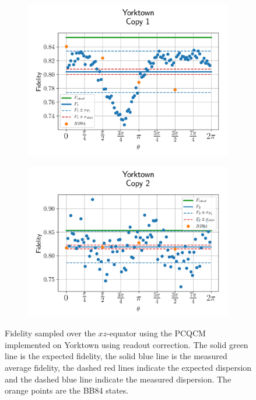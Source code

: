 \begin{figure}[H]
  \centering
  \begin{subfigure}{.5\textwidth}
    \centering
    \includegraphics[width=\textwidth]{Figures/PhaseCovariant/IBM/OnlyEquator/results_corrected_ibmqx2_copy1.png}
    \label{fig:pc_corrected_yorktown_equator_1}
  \end{subfigure}%
  \begin{subfigure}{.5\textwidth}
    \centering
    \includegraphics[width=\textwidth]{Figures/PhaseCovariant/IBM/OnlyEquator/results_corrected_ibmqx2_copy2.png}
    \label{fig:pc_corrected_yorktown_equator_2}
  \end{subfigure}
  \vspace{-0.5cm}
  \caption{Fidelity sampled over the $xz$-equator using the PCQCM implemented on Yorktown using readout correction. The solid green line is the expected fidelity, the solid blue line is the measured average fidelity, the dashed red lines indicate the expected dispersion and the dashed blue line indicate the measured dispersion. The orange points are the BB84 states.}
  \label{fig:pc_corrected_yorktown_equator}
\end{figure}


